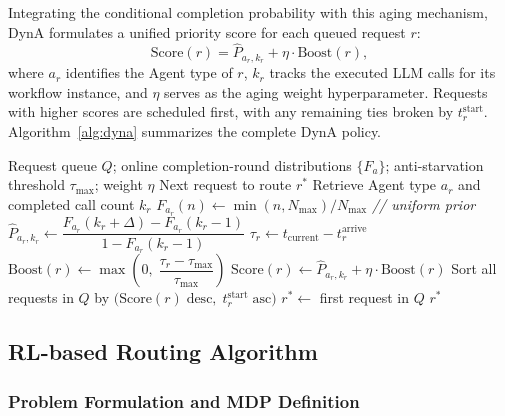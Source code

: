\documentclass[sigconf,review,anonymous]{acmart}
\begin{document}
Integrating the conditional completion probability with this aging mechanism, 
DynA formulates a unified priority score for each queued request $r$:
\begin{equation}
  \label{eq:priority-score}
  \text{Score}(r) = \hat{P}_{a_r, k_r} + \eta \cdot \text{Boost}(r),
\end{equation}
where $a_r$ identifies the Agent type of $r$, $k_r$ tracks the executed LLM calls 
for its workflow instance, and $\eta$ serves as the aging weight hyperparameter. 
Requests with higher scores are scheduled first, with any remaining ties broken 
by $t_r^{\text{start}}$. Algorithm~\ref{alg:dyna} summarizes the complete DynA policy.

\begin{algorithm}
  \caption{Dynamic-Aware Queuing Algorithm (DynA)}
  \label{alg:dyna}
  \begin{algorithmic}[1]
    \REQUIRE Request queue $Q$; online completion-round distributions
             $\{F_a\}$; anti-starvation threshold $\tau_{\max}$;
             weight $\eta$
    \ENSURE  Next request to route $r^*$
      \STATE Retrieve Agent type $a_r$ and completed call count $k_r$
        \STATE $F_{a_r}(n)\leftarrow \min(n,N_{\max})/N_{\max}$
               \quad\textit{// uniform prior}
      \ENDIF
      \STATE $\hat{P}_{a_r,k_r}\leftarrow
             \dfrac{F_{a_r}(k_r{+}\Delta)-F_{a_r}(k_r{-}1)}
                   {1-F_{a_r}(k_r{-}1)}$
      \STATE $\tau_r \leftarrow t_{\text{current}} - t_r^{\text{arrive}}$
      \STATE $\text{Boost}(r)\leftarrow
             \max\!\left(0,\;\dfrac{\tau_r-\tau_{\max}}{\tau_{\max}}\right)$
      \STATE $\text{Score}(r)\leftarrow
             \hat{P}_{a_r,k_r} + \eta\cdot\text{Boost}(r)$
    \ENDFOR
    \STATE Sort all requests in $Q$ by
           $\bigl(\text{Score}(r)\;\text{desc},\;
                  t_r^{\text{start}}\;\text{asc}\bigr)$
    \STATE $r^*\leftarrow$ first request in $Q$
    \RETURN $r^*$
  \end{algorithmic}
\end{algorithm}

\subsection{RL-based Routing Algorithm}
\label{sec:rl-routing}

\subsubsection{Problem Formulation and MDP Definition}
\label{subsec:mdp}
\end{document}
